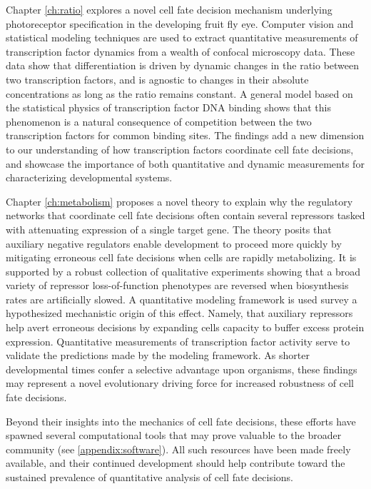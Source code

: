 Chapter \ref{ch:ratio} explores a novel cell fate decision mechanism underlying photoreceptor specification in the developing fruit fly eye. Computer vision and statistical modeling techniques are used to extract quantitative measurements of transcription factor dynamics from a wealth of confocal microscopy data. These data show that differentiation is driven by dynamic changes in the ratio between two transcription factors, and is agnostic to changes in their absolute concentrations as long as the ratio remains constant. A general model based on the statistical physics of transcription factor DNA binding shows that this phenomenon is a natural consequence of competition between the two transcription factors for common binding sites. The findings add a new dimension to our understanding of how transcription factors coordinate cell fate decisions, and showcase the importance of both quantitative and dynamic measurements for characterizing developmental systems. 

Chapter \ref{ch:metabolism} proposes a novel theory to explain why the regulatory networks that coordinate cell fate decisions often contain several repressors tasked with attenuating expression of a single target gene. The theory posits that auxiliary negative regulators enable development to proceed more quickly by mitigating erroneous cell fate decisions when cells are rapidly metabolizing. It is supported by a robust collection of qualitative experiments showing that a broad variety of repressor loss-of-function phenotypes are reversed when biosynthesis rates are artificially slowed. A quantitative modeling framework is used survey a hypothesized mechanistic origin of this effect. Namely, that auxiliary repressors help avert erroneous decisions by expanding cells capacity to buffer excess protein expression. Quantitative measurements of transcription factor activity serve to validate the predictions made by the modeling framework. As shorter developmental times confer a selective advantage upon organisms, these findings may represent a novel evolutionary driving force for increased robustness of cell fate decisions.

Beyond their insights into the mechanics of cell fate decisions, these efforts have spawned several computational tools that may prove valuable to the broader community (see \ref{appendix:software}). All such resources have been made freely available, and their continued development should help contribute toward the sustained prevalence of quantitative analysis of cell fate decisions.
